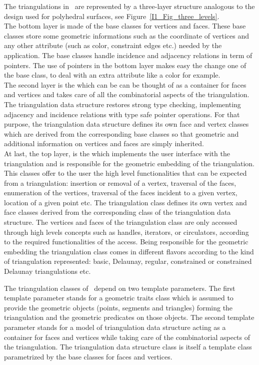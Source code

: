 The triangulations in \cgal\ are represented
by a three-layer structure  analogous to the design used for polyhedral
surfaces, see Figure~\ref{I1_Fig_three_levels}. \\
The bottom layer is made of  the base classes for vertices and faces.
These base classes store some 
geometric informations such as the coordinate of vertices 
and any other attribute (such as color, constraint edges etc.)
needed by the application.
The base classes handle
incidence and adjacency relations in term of  pointers.
The use of  pointers in the bottom layer 
makes easy 
the change one of the base
class, to deal with an extra attribute like a color for example.\\
The second layer is the 
which can be can be thought 
of as a container for faces and vertices
and takes care
of all the combinatorial aspects of the triangulation.
The {triangulation data structure} restores strong type checking,
implementing adjacency and incidence relations 
with type safe pointer operations.
For that purpose, the {triangulation data structure} defines its own face and vertex
classes which are derived
 from the corresponding 
base classes
so that geometric and additional information on vertices and faces 
are simply inherited. \\
  At last, the top layer, is  the 
which implements the user interface with the triangulation
and is responsible for the geometric embedding of the triangulation.
This classes offer to the user
the high level functionalities that can be expected from a triangulation:
insertion  or removal of a vertex, traversal of the faces,
enumeration of the vertices,
traversal of the   faces incident to a given vertex, location of a given point etc.
The {triangulation class} defines its own 
vertex and face classes
derived from the corresponding class of the {triangulation data structure}.
The vertices and faces of the {triangulation class}
are only accessed through high levels concepts such as 
handles, iterators, or circulators,
according to the required functionalities of the access.
Being  responsible for the geometric embedding 
the triangulation class
comes in different flavors according to the kind of triangulation represented:
basic, Delaunay, regular, constrained or constrained Delaunay
 triangulations etc.

The triangulation classes of \cgal\ depend on two template parameters.
The first template parameter stands for
 a geometric traits class which is assumed to provide
the geometric objects (points, segments and triangles) 
forming  the triangulation and the geometric predicates on those objects.
The second template parameter stands for a model
of  triangulation data
structure acting as a container for faces and vertices
while  taking care of the combinatorial aspects of the triangulation. 
The triangulation data structure class is itself a template
class parametrized by the base classes for faces and vertices.


